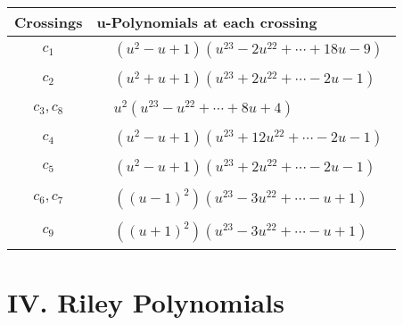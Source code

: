 \documentclass[1p]{elsarticle_modified}
\theoremstyle{definition}
\begin{document}
\begin{tabular}{m{50pt}|m{274pt}}
Crossings & \hspace{64pt}u-Polynomials at each crossing \\
\hline $$\begin{aligned}c_{1}\end{aligned}$$&$\begin{aligned}
&(u^2- u+1)(u^{23}-2 u^{22}+\cdots+18 u-9)
\end{aligned}$\\
\hline $$\begin{aligned}c_{2}\end{aligned}$$&$\begin{aligned}
&(u^2+u+1)(u^{23}+2 u^{22}+\cdots-2 u-1)
\end{aligned}$\\
\hline $$\begin{aligned}c_{3},c_{8}\end{aligned}$$&$\begin{aligned}
&u^2(u^{23}- u^{22}+\cdots+8 u+4)
\end{aligned}$\\
\hline $$\begin{aligned}c_{4}\end{aligned}$$&$\begin{aligned}
&(u^2- u+1)(u^{23}+12 u^{22}+\cdots-2 u-1)
\end{aligned}$\\
\hline $$\begin{aligned}c_{5}\end{aligned}$$&$\begin{aligned}
&(u^2- u+1)(u^{23}+2 u^{22}+\cdots-2 u-1)
\end{aligned}$\\
\hline $$\begin{aligned}c_{6},c_{7}\end{aligned}$$&$\begin{aligned}
&((u-1)^2)(u^{23}-3 u^{22}+\cdots- u+1)
\end{aligned}$\\
\hline $$\begin{aligned}c_{9}\end{aligned}$$&$\begin{aligned}
&((u+1)^2)(u^{23}-3 u^{22}+\cdots- u+1)
\end{aligned}$\\
\hline
\end{tabular}\newpage\renewcommand{\arraystretch}{1}
\centering \section*{ IV. Riley Polynomials}
\end{document}
